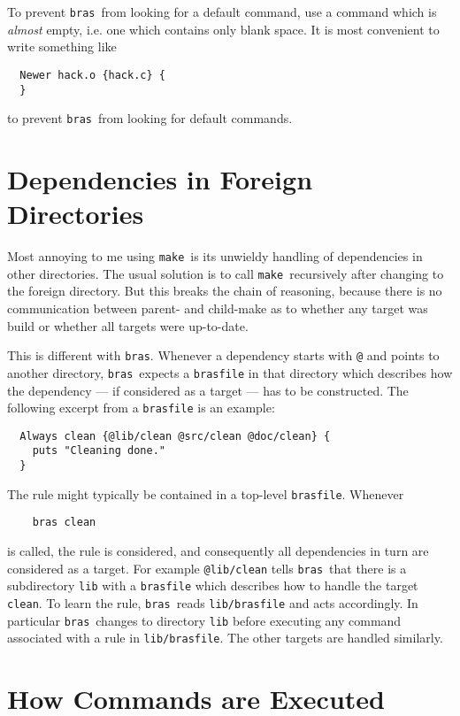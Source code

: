 \documentclass[12pt]{article}
\newcommand{\bras}{\texttt{bras}}
\newcommand{\make}{\texttt{make}}
\begin{document}
To prevent \bras\ from looking for a default command, use a command
which is \textit{almost} empty, i.e. one which contains only blank
space. It is most convenient to write something like
\begin{verbatim}
  Newer hack.o {hack.c} {
  }
\end{verbatim}
to prevent \bras\ from looking for default commands.

\section{Dependencies in Foreign Directories}

Most annoying to me using \make\ is its unwieldy handling of
dependencies in other directories. The usual solution is to call
\make\ recursively after changing to the foreign directory. But this
breaks the chain of reasoning, because there is no communication
between parent- and child-make as to whether any target was build or
whether all targets were up-to-date.

This is different with \bras. Whenever a dependency starts with
\texttt{@} and points to another directory, \bras\ expects
a \texttt{brasfile} in that directory which describes how the
dependency --- if considered as a target --- has to be constructed.
The following excerpt from a \texttt{brasfile} is an example:

\begin{verbatim}
  Always clean {@lib/clean @src/clean @doc/clean} {
    puts "Cleaning done."
  }
\end{verbatim}

The rule might typically be contained in a top-level
\texttt{brasfile}. Whenever 
\begin{verbatim}
    bras clean
\end{verbatim}
is called, the rule is considered, and consequently all
dependencies in turn are considered as a target. For example
\texttt{@lib/clean} tells \bras\ that there is a subdirectory
\texttt{lib} with a \texttt{brasfile} which
describes how to handle the target \texttt{clean}. To learn
the rule, \bras\ reads \texttt{lib/brasfile} and acts accordingly.
In particular \bras\ changes to directory \texttt{lib}
before executing any command associated with a rule in
\texttt{lib/brasfile}. The other targets are handled similarly.


\section{How Commands are Executed}
\label{secCmdExec}
\end{document}
